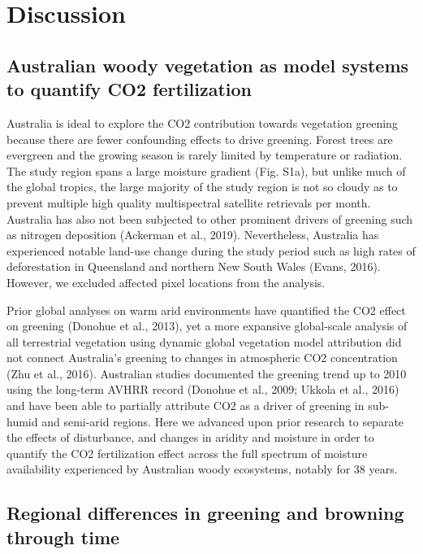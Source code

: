 \documentclass[gc, manuscript]{copernicus}
\begin{document}
\section{Discussion}

\subsection{Australian woody vegetation as model systems to quantify CO2
fertilization}

Australia is ideal to explore the CO2 contribution towards vegetation
greening because there are fewer confounding effects to drive greening.
Forest trees are evergreen and the growing season is rarely limited by
temperature or radiation. The study region spans a large moisture
gradient (Fig. S1a), but unlike much of the global tropics, the large
majority of the study region is not so cloudy as to prevent multiple
high quality multispectral satellite retrievals per month. Australia has
also not been subjected to other prominent drivers of greening such as
nitrogen deposition (Ackerman et al., 2019). Nevertheless, Australia has
experienced notable land-use change during the study period such as high
rates of deforestation in Queensland and northern New South Wales
(Evans, 2016). However, we excluded affected pixel locations from the
analysis.

Prior global analyses on warm arid environments have quantified the CO2
effect on greening (Donohue et al., 2013), yet a more expansive
global-scale analysis of all terrestrial vegetation using dynamic global
vegetation model attribution did not connect Australia's greening to
changes in atmospheric CO2 concentration (Zhu et al., 2016). Australian
studies documented the greening trend up to 2010 using the long-term
AVHRR record (Donohue et al., 2009; Ukkola et al., 2016) and have been
able to partially attribute CO2 as a driver of greening in sub-humid and
semi-arid regions. Here we advanced upon prior research to separate the
effects of disturbance, and changes in aridity and moisture in order to
quantify the CO2 fertilization effect across the full spectrum of
moisture availability experienced by Australian woody ecosystems,
notably for 38 years.

\subsection{Regional differences in greening and browning through time}
\end{document}
